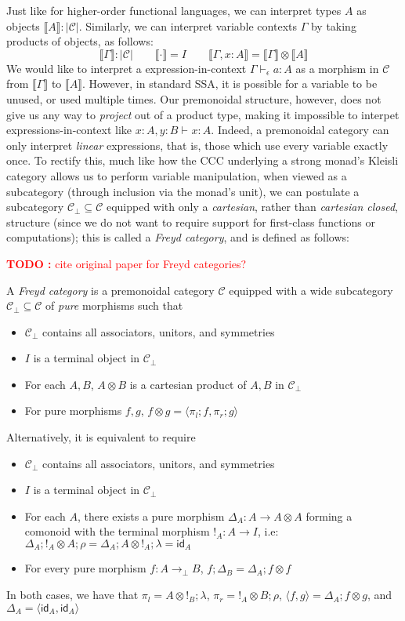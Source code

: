 \documentclass[acmsmall,screen,review]{acmart}
\newcounter{todos}
\newcommand{\TODO}[1]{{
  \stepcounter{todos}
  \begin{center}\large{\textcolor{red}{\textbf{TODO \arabic{todos}:} #1}}\end{center}
}}
\newcommand{\mc}[1]{\ensuremath{\mathcal{#1}}}
\newcommand{\ms}[1]{\ensuremath{\mathsf{#1}}}
\newcommand{\bhyp}[2]{#1 : #2}
\newcommand{\hasty}[4]{#1 \vdash_{#2} #3: {#4}}
\newcommand{\dnt}[1]{\llbracket{#1}\rrbracket}
\newcommand{\tmor}[1]{{!}_{#1}}
\newcommand{\dmor}[1]{{\Delta}_{#1}}
\begin{document}
Just like for higher-order functional languages, we can interpret types $A$ as objects $\dnt{A} :
|\mc{C}|$. Similarly, we can interpret variable contexts $\Gamma$ by taking products of objects, as
follows:
$$
\boxed{\dnt{\Gamma} : |\mc{C}|} \qquad 
  \dnt{\cdot} = I \qquad \dnt{\Gamma, \bhyp{x}{A}} = \dnt{\Gamma} \otimes \dnt{A}
$$
We would like to interpret a expression-in-context $\hasty{\Gamma}{\epsilon}{a}{A}$ as a morphism in
$\mc{C}$ from $\dnt{\Gamma}$ to $\dnt{A}$. However, in standard SSA, it is possible for a variable
to be unused, or used multiple times. Our premonoidal structure, however, does not give us any way
to \emph{project} out of a product type, making it impossible to interpet expressions-in-context
like
$
\hasty{\bhyp{x}{A}, \bhyp{y}{B}}{}{x}{A}
$. 
Indeed, a premonoidal category can only interpret \emph{linear} expressions, that is, those which
use every variable exactly once. To rectify this, much like how the CCC underlying a strong monad's
Kleisli category allows us to perform variable manipulation, when viewed as a subcategory (through
inclusion via the monad's unit), we can postulate a subcategory $\mc{C}_\bot \subseteq \mc{C}$
equipped with only a \emph{cartesian}, rather than \emph{cartesian closed}, structure (since we do
not want to require support for first-class functions or computations); this is called a \emph{Freyd
category}, and is defined as follows: \TODO{cite original paper for Freyd categories?}
\begin{definition}
  A \emph{Freyd category} is a premonoidal category $\mc{C}$ equipped with a wide subcategory
  $\mc{C}_\bot \subseteq \mc{C}$ of \emph{pure} morphisms such that
  \begin{itemize}
    \item $\mc{C}_\bot$ contains all associators, unitors, and symmetries
    \item $I$ is a terminal object in $\mc{C}_\bot$
    \item For each $A, B$, $A \otimes B$ is a cartesian product of $A, B$ in $\mc{C}_\bot$
    \item For pure morphisms $f, g$, $f \otimes g = \langle \pi_l; f, \pi_r ; g  \rangle$
  \end{itemize}
  Alternatively, it is equivalent to require
  \begin{itemize}
    \item $\mc{C}_\bot$ contains all associators, unitors, and symmetries
    \item $I$ is a terminal object in $\mc{C}_\bot$
    \item For each $A$, there exists a pure morphism $\dmor{A} : A \to A \otimes A$ forming a
          comonoid with the terminal morphism $\tmor{A} : A \to I$, i.e: $\dmor{A} ; \tmor{A}
          \otimes A ; \rho = \dmor{A} ; A \otimes \tmor {A} ; \lambda = \ms{id}_A$
    \item For every pure morphism $f : A \to_\bot B$, $f ; \dmor{B} = \dmor{A} ; f \otimes f$
  \end{itemize}
  In both cases, we have that $\pi_l = A \otimes \tmor{B} ; \lambda$, $\pi_r = \tmor{A}
  \otimes B ; \rho$, $\langle f, g \rangle = \dmor{A} ; f \otimes g$, and $\dmor{A} = \langle
  \ms{id}_A, \ms{id}_A \rangle$
\end{definition}
\end{document}
